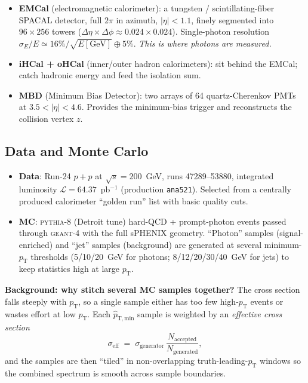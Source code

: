 \documentclass[11pt]{article}
\newlength{\calloutwd}
\newenvironment{bgbox}{%
  \par\vspace{6pt}\noindent
  \setlength{\fboxsep}{8pt}%
  \begingroup\color{black}%
  \def\calloutbg{boxblue}\def\calloutline{bgblueline}%
  \fcolorbox{bgblueline}{boxblue}\bgroup
  \begin{minipage}{\calloutwd}}
  {\end{minipage}\egroup\endgroup\par\vspace{6pt}}
\newcommand{\roots}{\sqrt{s}}
\newcommand{\pT}{p_{\mathrm{T}}}
\newcommand{\pp}{p{+}p}
\begin{document}
\begin{itemize}[leftmargin=1.4em]
  \item \textbf{EMCal} (electromagnetic calorimeter): a tungsten / scintillating-fiber SPACAL
  detector, full $2\pi$ in azimuth, $|\eta|<1.1$, finely segmented into $96\times256$ towers
  ($\Delta\eta\times\Delta\phi\approx0.024\times0.024$). Single-photon resolution
  $\sigma_E/E\simeq 16\%/\sqrt{E[\mathrm{GeV}]}\oplus 5\%$. \emph{This is where photons are
  measured.}
  \item \textbf{iHCal + oHCal} (inner/outer hadron calorimeters): sit behind the EMCal; catch
  hadronic energy and feed the isolation sum.
  \item \textbf{MBD} (Minimum Bias Detector): two arrays of 64 quartz-Cherenkov PMTs at
  $3.5<|\eta|<4.6$. Provides the minimum-bias trigger and reconstructs the collision vertex $z$.
\end{itemize}

\subsection{Data and Monte Carlo}

\begin{itemize}[leftmargin=1.4em]
  \item \textbf{Data}: Run-24 $\pp$ at $\roots=200$~GeV, runs 47289--53880, integrated
  luminosity $\mathcal{L}=64.37$~pb$^{-1}$ (production \texttt{ana521}). Selected from a
  centrally produced calorimeter ``golden run'' list with basic quality cuts.
  \item \textbf{MC}: \textsc{pythia}-8 (Detroit tune) hard-QCD + prompt-photon events passed
  through \textsc{geant}-4 with the full sPHENIX geometry. ``Photon'' samples (signal-enriched)
  and ``jet'' samples (background) are generated at several minimum-$\pT$ thresholds (5/10/20~GeV
  for photons; 8/12/20/30/40~GeV for jets) to keep statistics high at large $\pT$.
\end{itemize}

\begin{bgbox}
\textbf{Background: why stitch several MC samples together?} The cross section falls steeply with
$\pT$, so a single sample either has too few high-$\pT$ events or wastes effort at low $\pT$. Each
$\hat p_{\mathrm{T,min}}$ sample is weighted by an \emph{effective cross section}
\[
  \sigma_{\mathrm{eff}} \;=\; \sigma_{\mathrm{generator}}\,
    \frac{N_{\mathrm{accepted}}}{N_{\mathrm{generated}}},
\]
and the samples are then ``tiled'' in non-overlapping truth-leading-$\pT$ windows so the combined
spectrum is smooth across sample boundaries.
\end{bgbox}
\end{document}
